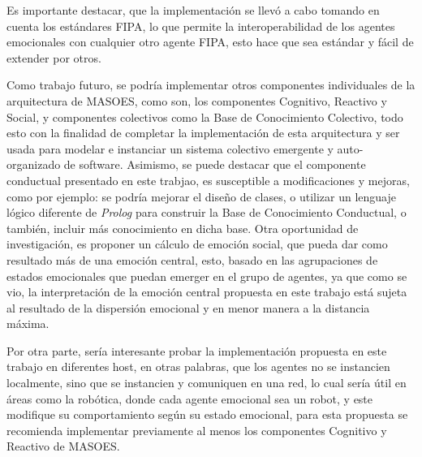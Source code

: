 Es importante destacar, que la implementación se llevó a cabo tomando en cuenta los estándares FIPA,
lo que permite la interoperabilidad de los agentes emocionales con cualquier otro agente FIPA,
esto hace que sea estándar y fácil de extender por otros.

Como trabajo futuro, se podría implementar otros componentes individuales de la arquitectura de MASOES,
como son, los componentes Cognitivo, Reactivo y Social, y componentes colectivos como
la Base de Conocimiento Colectivo, todo esto con la finalidad de completar la implementación
de esta arquitectura y ser usada para modelar e instanciar un sistema colectivo
emergente y auto-organizado de software. Asimismo, se puede destacar que el componente conductual
presentado en este trabjao, es susceptible a modificaciones y mejoras, como por ejemplo:
se podría mejorar el diseño de clases, o utilizar un lenguaje lógico diferente de \textit{Prolog}
para construir la Base de Conocimiento Conductual, o también, incluir más conocimiento
en dicha base.
Otra oportunidad de investigación, es proponer un cálculo de emoción social,
que pueda dar como resultado más de una emoción central, esto, basado en las agrupaciones de estados emocionales
que puedan emerger en el grupo de agentes, ya que como se vio, la interpretación de la emoción central propuesta
en este trabajo está sujeta al resultado de la dispersión emocional y en menor manera a la distancia máxima.

Por otra parte, sería interesante probar la implementación propuesta en este trabajo
en diferentes host, en otras palabras, que los agentes no se instancien localmente, sino
que se instancien y comuniquen en una red, lo cual sería útil en áreas como la robótica,
donde cada agente emocional sea un robot, y este modifique su comportamiento
según su estado emocional, para esta propuesta se recomienda implementar previamente
al menos los componentes Cognitivo y Reactivo de MASOES.
